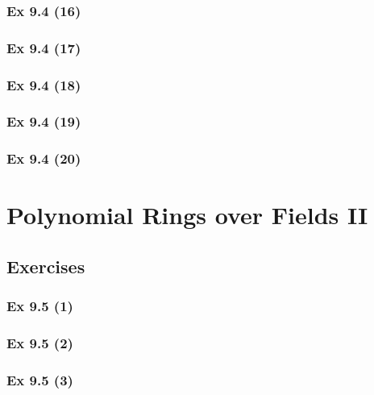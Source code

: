 \subsubsection{Ex 9.4 (16)}\label{sec:Ex_9.4.16}

\subsubsection{Ex 9.4 (17)}\label{sec:Ex_9.4.17}

\subsubsection{Ex 9.4 (18)}\label{sec:Ex_9.4.18}

\subsubsection{Ex 9.4 (19)}\label{sec:Ex_9.4.19}

\subsubsection{Ex 9.4 (20)}\label{sec:Ex_9.4.20}

\newpage		%

\section{Polynomial Rings over Fields II}\label{sec:9.5}	
\subsection*{Exercises}\label{sec:9.5_Exercises}

\subsubsection{Ex 9.5 (1)}\label{sec:Ex_9.5.1}

\subsubsection{Ex 9.5 (2)}\label{sec:Ex_9.5.2}

\subsubsection{Ex 9.5 (3)}\label{sec:Ex_9.5.3}

